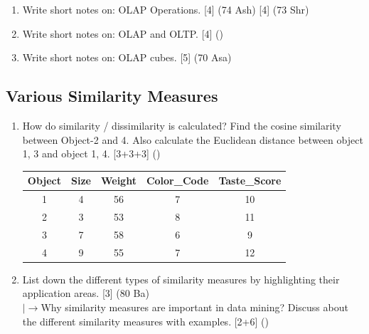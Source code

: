 \documentclass[12pt]{article}
\newcommand{\lb}{\\$\left|\rightarrow\right.$}
\begin{document}
\begin{enumerate}[topsep=0pt, noitemsep]
      \item Write short notes on: OLAP Operations. \hfill [4] (74 Ash) [4] (73 Shr)

      \item Write short notes on: OLAP and OLTP. \hfill [4] ()

      \item Write short notes on: OLAP cubes. \hfill [5] (70 Asa)
    \end{enumerate}

  \subsection{Various Similarity Measures}
    \begin{enumerate}[topsep=0pt, noitemsep]
      \item How do similarity / dissimilarity is calculated? Find the cosine similarity between Object-2 and 4. Also calculate the Euclidean distance between object 1, 3 and object 1, 4. \hfill [3+3+3] ()\\
        \small
        \begin{tabular}{|c|c|c|c|c|}
          \hline
          Object & Size & Weight & Color\_Code & Taste\_Score \\ \hline
          1 & 4 & 56 & 7 & 10 \\ \hline
          2 & 3 & 53 & 8 & 11 \\ \hline
          3 & 7 & 58 & 6 & 9 \\ \hline
          4 & 9 & 55 & 7 & 12 \\ \hline
        \end{tabular}
        \normalsize

      \item List down the different types of similarity measures by highlighting their application areas. \hfill [3] (80 Ba)
        \lb Why similarity measures are important in data mining? Discuss about the different similarity measures with examples. \hfill [2+6] ()


\end{enumerate}
\end{document}
